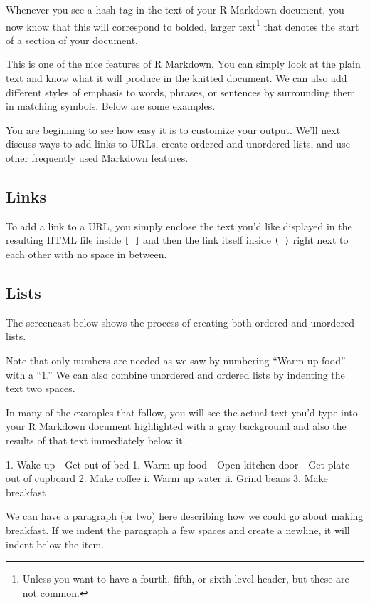 \documentclass[]{tufte-book}
\newenvironment{Shaded}{\begin{snugshade}}{\end{snugshade}}
\newcommand{\FloatTok}[1]{\textcolor[rgb]{0.00,0.00,0.81}{#1}}
\newcommand{\NormalTok}[1]{#1}
\begin{document}
Whenever you see a hash-tag in the text of your R Markdown document, you now know that this will correspond to bolded, larger text\footnote{Unless you want to have a fourth, fifth, or sixth level header, but these are not common.} that denotes the start of a section of your document.

This is one of the nice features of R Markdown. You can simply look at the plain text and know what it will produce in the knitted document. We can also add different styles of emphasis to words, phrases, or sentences by surrounding them in matching symbols. Below are some examples.

You are beginning to see how easy it is to customize your output. We'll next discuss ways to add links to URLs, create ordered and unordered lists, and use other frequently used Markdown features.

\hypertarget{links}{%
\subsection{Links}\label{links}}

To add a link to a URL, you simply enclose the text you'd like displayed in the resulting HTML file inside \texttt{{[}\ {]}} and then the link itself inside \texttt{(\ )} right next to each other with no space in between.

\hypertarget{lists}{%
\subsection{Lists}\label{lists}}

The screencast below shows the process of creating both ordered and unordered lists.

Note that only numbers are needed as we saw by numbering ``Warm up food'' with a ``1.'' We can also combine unordered and ordered lists by indenting the text two spaces.

In many of the examples that follow, you will see the actual text you'd type into your R Markdown document highlighted with a gray background and also the results of that text immediately below it.

\begin{Shaded}
\begin{Highlighting}[]
\NormalTok{1. }\FloatTok{Wake up}
\FloatTok{  - Get out of bed}
\FloatTok{1. Warm up food}
\FloatTok{  - Open kitchen door}
\FloatTok{  - Get plate out of cupboard}
\FloatTok{2. Make coffee}
\FloatTok{  i. Warm up water}
\FloatTok{  ii. Grind beans}
\FloatTok{3. Make breakfast}

\NormalTok{  We can have a paragraph (or two) here describing how we could go about making}
\NormalTok{  breakfast. If we indent the paragraph a few spaces and create a newline, it}
\NormalTok{  will indent below the item.}
\end{Highlighting}
\end{Shaded}
\end{document}
